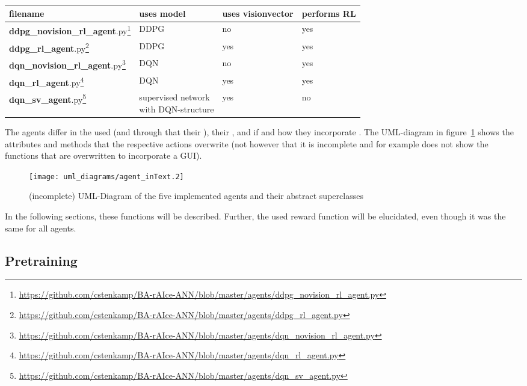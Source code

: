 \begin{flushleft}
\begin{tabular}{l l l l}
	filename & uses model & uses visionvector & performs RL\\
	\hline
	\textbf{ddpg\_novision\_rl\_agent}.py\footnote{\url{https://github.com/cstenkamp/BA-rAIce-ANN/blob/master/agents/ddpg_novision_rl_agent.py}} & DDPG & no & yes\\	
	\textbf{ddpg\_rl\_agent}.py\footnote{\url{https://github.com/cstenkamp/BA-rAIce-ANN/blob/master/agents/ddpg_rl_agent.py}} & DDPG & yes & yes\\
	\textbf{dqn\_novision\_rl\_agent}.py\footnote{\url{https://github.com/cstenkamp/BA-rAIce-ANN/blob/master/agents/dqn_novision_rl_agent.py}} & DQN & no & yes\\
	\textbf{dqn\_rl\_agent}.py\footnote{\url{https://github.com/cstenkamp/BA-rAIce-ANN/blob/master/agents/dqn_rl_agent.py}} & DQN & yes & yes\\
	\textbf{dqn\_sv\_agent}.py\footnote{\url{https://github.com/cstenkamp/BA-rAIce-ANN/blob/master/agents/dqn_sv_agent.py}} & \blap{supervised network\\ with DQN-structure} & yes & no\\[2em]
\end{tabular}
\end{flushleft}


The agents differ in the used  (and through that their ), their , and if and how they incorporate . The UML-diagram in figure~\ref{fig:umlAgents} shows the attributes and methods that the respective actions overwrite (not however that it is incomplete and for example does not show the functions that are overwritten to incorporate a GUI).

\begin{figure}[h]
	\centering 
	\texttt{[image: uml\_diagrams/agent\_inText.2]}  
	\caption{(incomplete) UML-Diagram of the five implemented agents and their abstract superclasses}
	\label{fig:umlAgents}
\end{figure}

In the following sections, these functions will be described. Further, the used reward function will be elucidated, even though it was the same for all agents.

\subsection{Pretraining}

